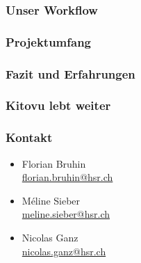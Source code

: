 \documentclass{beamer}
\begin{document}
  \begin{frame}
    \frametitle{Unser Workflow}
  \end{frame}

  \begin{frame}
    \frametitle{Projektumfang}
  \end{frame}

  \begin{frame}
    \frametitle{Fazit und Erfahrungen}
  \end{frame}

  \begin{frame}
    \frametitle{Kitovu lebt weiter}
  \end{frame}

  \begin{frame}
    \frametitle{Kontakt}
    \begin{itemize}
      \item Florian Bruhin \\ \url{florian.bruhin@hsr.ch} \\[2em]
      \item Méline Sieber \\ \url{meline.sieber@hsr.ch} \\[2em]
      \item Nicolas Ganz \\ \url{nicolas.ganz@hsr.ch}
    \end{itemize}
  \end{frame}
\end{document}
